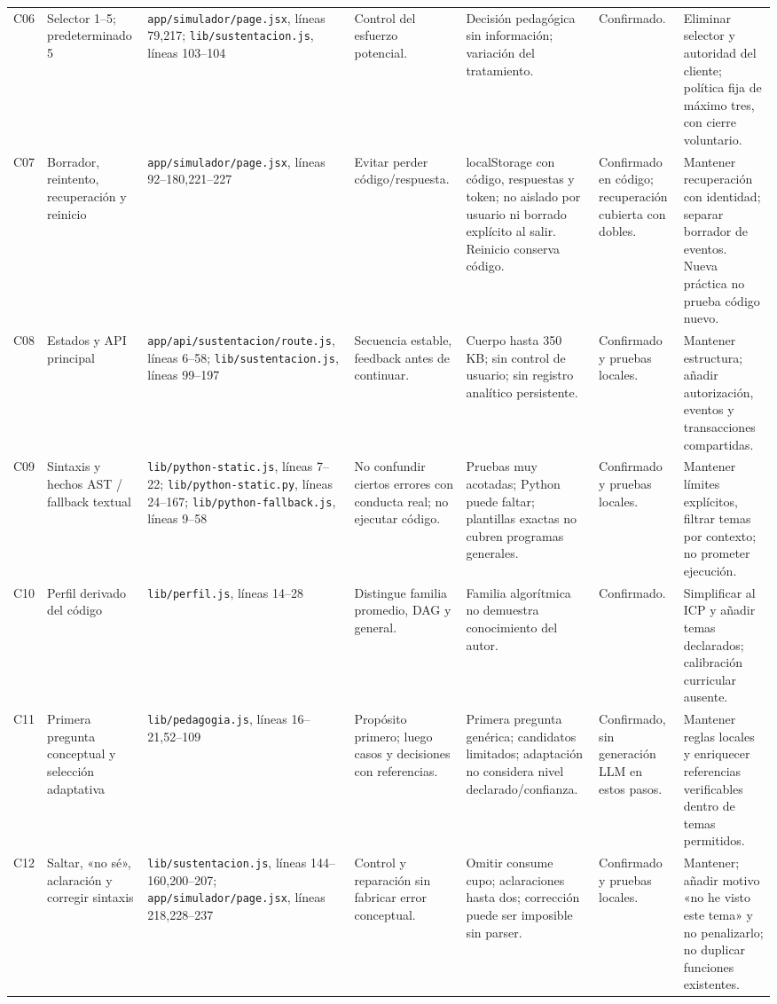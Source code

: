 \documentclass[11pt,a4paper]{report}
\newcommand{\src}[2]{\nolinkurl{#1}, líneas #2}
\begin{document}
\begin{landscape}
\begin{longtable}{P{0.8cm}P{3cm}P{5.1cm}P{4cm}P{3.6cm}P{2.5cm}P{4.4cm}}
C06 & Selector 1--5; predeterminado 5 & \src{app/simulador/page.jsx}{79,217}; \src{lib/sustentacion.js}{103--104} & Control del esfuerzo potencial. & Decisión pedagógica sin información; variación del tratamiento. & Confirmado. & Eliminar selector y autoridad del cliente; política fija de máximo tres, con cierre voluntario.\\
C07 & Borrador, reintento, recuperación y reinicio & \src{app/simulador/page.jsx}{92--180,221--227} & Evitar perder código/respuesta. & localStorage con código, respuestas y token; no aislado por usuario ni borrado explícito al salir. Reinicio conserva código. & Confirmado en código; recuperación cubierta con dobles. & Mantener recuperación con identidad; separar borrador de eventos. Nueva práctica no prueba código nuevo.\\
C08 & Estados y API principal & \src{app/api/sustentacion/route.js}{6--58}; \src{lib/sustentacion.js}{99--197} & Secuencia estable, feedback antes de continuar. & Cuerpo hasta 350 KB; sin control de usuario; sin registro analítico persistente. & Confirmado y pruebas locales. & Mantener estructura; añadir autorización, eventos y transacciones compartidas.\\
C09 & Sintaxis y hechos AST / fallback textual & \src{lib/python-static.js}{7--22}; \src{lib/python-static.py}{24--167}; \src{lib/python-fallback.js}{9--58} & No confundir ciertos errores con conducta real; no ejecutar código. & Pruebas muy acotadas; Python puede faltar; plantillas exactas no cubren programas generales. & Confirmado y pruebas locales. & Mantener límites explícitos, filtrar temas por contexto; no prometer ejecución.\\
C10 & Perfil derivado del código & \src{lib/perfil.js}{14--28} & Distingue familia promedio, DAG y general. & Familia algorítmica no demuestra conocimiento del autor. & Confirmado. & Simplificar al ICP y añadir temas declarados; calibración curricular ausente.\\
C11 & Primera pregunta conceptual y selección adaptativa & \src{lib/pedagogia.js}{16--21,52--109} & Propósito primero; luego casos y decisiones con referencias. & Primera pregunta genérica; candidatos limitados; adaptación no considera nivel declarado/confianza. & Confirmado, sin generación LLM en estos pasos. & Mantener reglas locales y enriquecer referencias verificables dentro de temas permitidos.\\
C12 & Saltar, «no sé», aclaración y corregir sintaxis & \src{lib/sustentacion.js}{144--160,200--207}; \src{app/simulador/page.jsx}{218,228--237} & Control y reparación sin fabricar error conceptual. & Omitir consume cupo; aclaraciones hasta dos; corrección puede ser imposible sin parser. & Confirmado y pruebas locales. & Mantener; añadir motivo «no he visto este tema» y no penalizarlo; no duplicar funciones existentes.\\

\end{longtable}
\end{landscape}
\end{document}
